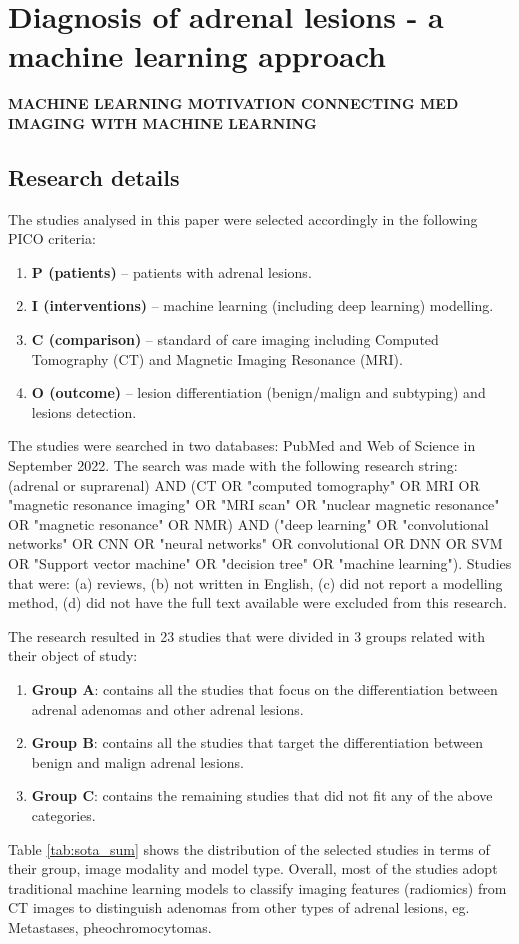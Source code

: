 \documentclass{article}
\begin{document}
\section{Diagnosis of adrenal lesions - a machine learning approach}

\textbf{MACHINE LEARNING MOTIVATION CONNECTING MED IMAGING WITH MACHINE LEARNING} 

\subsection{Research details}

The studies analysed in this paper were selected accordingly in the following PICO criteria:

\begin{enumerate}
    \item[] \textbf{P (patients) }– patients with adrenal lesions.
    \item[] \textbf{I (interventions) }– machine learning (including deep learning) modelling.
    \item[] \textbf{C (comparison) }– standard of care imaging including Computed Tomography (CT) and Magnetic Imaging Resonance (MRI).
    \item[] \textbf{O (outcome) }– lesion differentiation (benign/malign and subtyping) and lesions detection.
\end{enumerate}

The studies were searched in two databases: PubMed and Web of Science in
September 2022. The search was made with the following research string: (adrenal
or suprarenal) AND (CT OR "computed tomography" OR MRI OR "magnetic resonance
imaging" OR "MRI scan" OR "nuclear magnetic resonance" OR "magnetic resonance"
OR NMR) AND ("deep learning" OR "convolutional networks" OR CNN OR "neural
networks" OR convolutional OR DNN OR SVM OR "Support vector machine" OR
"decision tree" OR "machine learning"). Studies that were: (a) reviews, (b) not
written in English, (c) did not report a modelling method, (d) did not have the
full text available were excluded from this research.

The research resulted in 23 studies that were divided in 3 groups related with
their object of study:
\begin{enumerate}
    \item[] \textbf{Group A}: contains all the studies that focus on the
        differentiation between adrenal adenomas and other adrenal lesions.
    \item[] \textbf{Group B}: contains all the studies that target the
        differentiation between benign and malign adrenal lesions.
    \item[] \textbf{Group C}: contains the remaining studies that did not fit
        any of the above categories.
\end{enumerate}
Table \ref{tab:sota_sum} shows the distribution of the selected studies in terms
of their group, image modality and model type. Overall, most of the studies
adopt traditional machine learning models to classify imaging features
(radiomics) from CT images to distinguish adenomas from other types of adrenal
lesions, eg. Metastases, pheochromocytomas.
\end{document}
